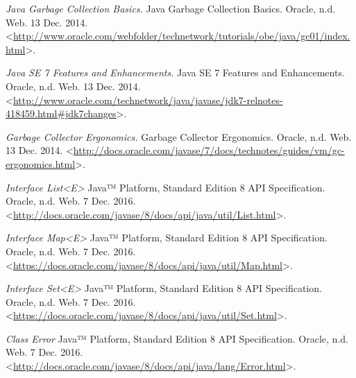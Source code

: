 \begin{thebibliography}{21}
\textit{Java Garbage Collection Basics.} Java Garbage Collection Basics. Oracle, n.d. Web. 13 Dec. 2014. <\url{http://www.oracle.com/webfolder/technetwork/tutorials/obe/java/gc01/index.html}>.


\textit{Java SE 7 Features and Enhancements.} Java SE 7 Features and Enhancements. Oracle, n.d. Web. 13 Dec. 2014. <\url{http://www.oracle.com/technetwork/java/javase/jdk7-relnotes-418459.html#jdk7changes}>.


\textit{Garbage Collector Ergonomics.} Garbage Collector Ergonomics. Oracle, n.d. Web. 13 Dec. 2014. <\url{http://docs.oracle.com/javase/7/docs/technotes/guides/vm/gc-ergonomics.html}>.


\textit{Interface List<E>} Java™ Platform, Standard Edition 8
API Specification. Oracle, n.d. Web. 7 Dec. 2016. <\url{http://docs.oracle.com/javase/8/docs/api/java/util/List.html}>.


\textit{Interface Map<E>} Java™ Platform, Standard Edition 8
API Specification. Oracle, n.d. Web. 7 Dec. 2016. <\url{https://docs.oracle.com/javase/8/docs/api/java/util/Map.html}>.


\textit{Interface Set<E>} Java™ Platform, Standard Edition 8
API Specification. Oracle, n.d. Web. 7 Dec. 2016. <\url{https://docs.oracle.com/javase/8/docs/api/java/util/Set.html}>.


\textit{Class Error} Java™ Platform, Standard Edition 8
API Specification. Oracle, n.d. Web. 7 Dec. 2016. <\url{http://docs.oracle.com/javase/8/docs/api/java/lang/Error.html}>.



\end{thebibliography}

